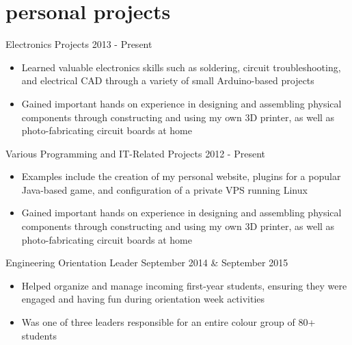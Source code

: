 \documentclass[hidelinks]{kkurucz-cv}
\begin{document}

\section{personal projects}
\begin{entrylist}
\entry
{\vspace{-8mm}\null}
{Electronics Projects}
{2013 - Present}
{
\vspace{-3mm}
\begin{itemize}
	\item Learned valuable electronics skills such as soldering, circuit troubleshooting, and electrical CAD through a variety of small Arduino-based projects
	\item Gained important hands on experience in designing and assembling physical components through constructing and using my own 3D printer, as well as photo-fabricating circuit boards at home
\end{itemize}
}
{\null}
\entry
{\vspace{-8mm}\null}
{Various Programming and IT-Related Projects}
{2012 - Present}
{
\vspace{-3mm}
\begin{itemize}
	\item Examples include the creation of my personal website, plugins for a popular Java-based game, and configuration of a private VPS running Linux 
	\item Gained important hands on experience in designing and assembling physical components through constructing and using my own 3D printer, as well as photo-fabricating circuit boards at home
\end{itemize}
}
{\null}
\entry
{\vspace{-8mm}\null}
{Engineering Orientation Leader}
{September 2014 \& September 2015}
{
\vspace{-3mm}
\begin{itemize}
	\item Helped organize and manage incoming first-year students, ensuring they were engaged and having fun during orientation week activities 
	\item Was one of three leaders responsible for an entire colour group of 80+ students
	\end{itemize}
}
{\null}
\end{entrylist}
\end{document}
